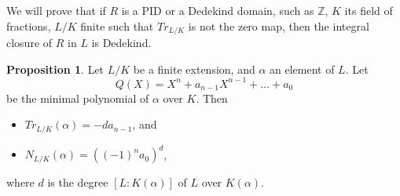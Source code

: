 \documentclass{article}
\newcommand{\Z}{\mathbb{Z}}
\newcommand{\rb}[1]{\left( #1 \right)}
\renewcommand{\sb}[1]{\left[ #1 \right]}
\theoremstyle{definition}\newtheorem{definition}{Definition}[subsection]
\theoremstyle{definition}\newtheorem{remark}[definition]{Remark}
\theoremstyle{definition}\newtheorem*{example}{Example}
\theoremstyle{definition}\newtheorem*{note}{Note}
\newtheorem{proposition}[definition]{Proposition}
\begin{document}
We will prove that if $ R $ is a PID or a Dedekind domain, such as $ \Z $, $ K $ its field of fractions, $ L / K $ finite such that $ Tr_{L / K} $ is not the zero map, then the integral closure of $ R $ in $ L $ is Dedekind.


\begin{proposition}
\label{prop:12.2.2}
Let $ L / K $ be a finite extension, and $ \alpha $ an element of $ L $. Let
$$ Q\rb{X} = X^n + a_{n - 1}X^{n - 1} + \dots + a_0 $$
be the minimal polynomial of $ \alpha $ over $ K $. Then
\begin{itemize}
\item $ Tr_{L / K}\rb{\alpha} = -da_{n - 1} $, and
\item $ N_{L / K}\rb{\alpha} = \rb{\rb{-1}^na_0}^d $,
\end{itemize}
where $ d $ is the degree $ \sb{L : K\rb{\alpha}} $ of $ L $ over $ K\rb{\alpha} $.
\end{proposition}
\end{document}
